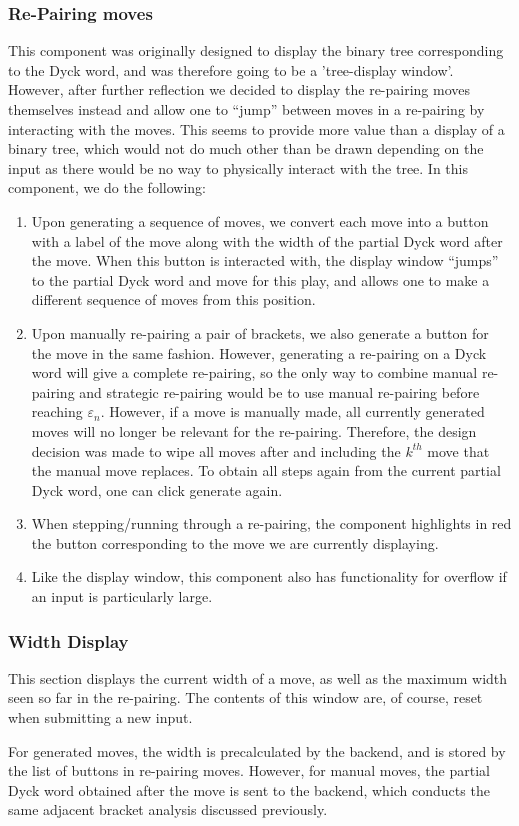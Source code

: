 \subsubsection{Re-Pairing moves}
This component was originally designed to display the binary tree corresponding to the Dyck word, and was therefore going to be a 'tree-display window'. However, after further reflection we decided to display the re-pairing moves themselves instead and allow one to ``jump'' between moves in a re-pairing by interacting with the moves. This seems to provide more value than a display of a binary tree, which would not do much other than be drawn depending on the input as there would be no way to physically interact with the tree. In this component, we do the following:
\begin{enumerate}
    \item Upon generating a sequence of moves, we convert each move into a button with a label of the move along with the width of the partial Dyck word after the move. When this button is interacted with, the display window ``jumps'' to the partial Dyck word and move for this play, and allows one to make a different sequence of moves from this position. 
    \item Upon manually re-pairing a pair of brackets, we also generate a button for the move in the same fashion. However, generating a re-pairing on a Dyck word will give a complete re-pairing, so the only way to combine manual re-pairing and strategic re-pairing would be to use manual re-pairing before reaching $\varepsilon_n$. However, if a move is manually made, all currently generated moves will no longer be relevant for the re-pairing. Therefore, the design decision was made to wipe all moves after and including the $k^{th}$ move that the manual move replaces. To obtain all steps again from the current partial Dyck word, one can click generate again. 
    \item When stepping/running through a re-pairing, the component highlights in red the button corresponding to the move we are currently displaying. 
    \item Like the display window, this component also has functionality for overflow if an input is particularly large.
\end{enumerate}

\subsubsection{Width Display}
This section displays the current width of a move, as well as the maximum width seen so far in the re-pairing. The contents of this window are, of course, reset when submitting a new input.

For generated moves, the width is precalculated by the backend, and is stored by the list of buttons in re-pairing moves. However, for manual moves, the partial Dyck word obtained after the move is sent to the backend, which conducts the same adjacent bracket analysis discussed previously. 